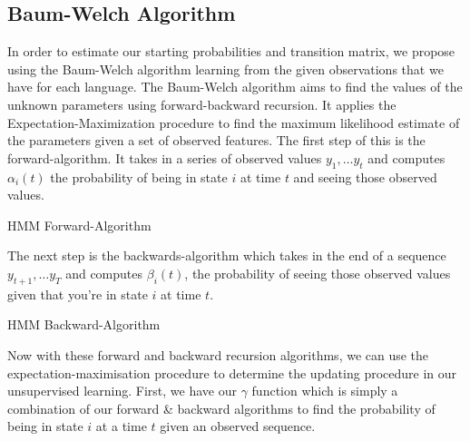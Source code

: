 \documentclass[12pt]{article}
\makeatletter
\def\BState{\State\hskip-\ALG@thistlm}
\makeatother
\begin{document}
\subsection{Baum-Welch Algorithm}
In order to estimate our starting probabilities and transition matrix, we propose using the Baum-Welch algorithm learning from the given observations that we have for each language. The Baum-Welch algorithm aims to find the values of the unknown parameters using forward-backward recursion. It applies the Expectation-Maximization procedure to find the maximum likelihood estimate of the parameters given a set of observed features. The first step of this is the forward-algorithm. It takes in a series of observed values $y_1,\ldots y_t$ and computes $\alpha_i(t)$ the probability of being in state $i$ at time $t$ and seeing those observed values.
\\
\FloatBarrier
\begin{algorithm}
\caption{HMM Forward-Algorithm}
\end{algorithm}
\FloatBarrier
The next step is the backwards-algorithm which takes in the end of a sequence $y_{t+1},\ldots y_T$ and computes $\beta_i(t)$, the probability of seeing those observed values given that you're in state $i$ at time $t$.\\
\FloatBarrier
\begin{algorithm}
\caption{HMM Backward-Algorithm}
\end{algorithm}
\FloatBarrier
Now with these forward and backward recursion algorithms, we can use the expectation-maximisation procedure to determine the updating procedure in our unsupervised learning. First, we have our $\gamma$ function which is simply a combination of our forward \& backward algorithms to find the probability of being in state $i$ at a time $t$ given an observed sequence.
\end{document}

